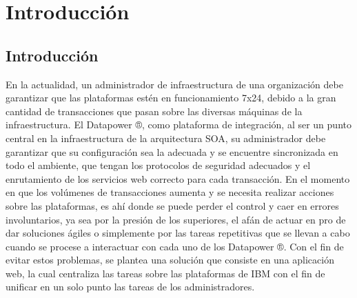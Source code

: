 \chapter{Introducción}
\section*{Introducción}
En la actualidad, un administrador de infraestructura de una organización debe garantizar que las plataformas estén en funcionamiento 7x24, debido a la gran cantidad de transacciones que pasan sobre las diversas máquinas de la infraestructura.
\newline
El Datapower ®, como plataforma de integración, al ser un punto central en la infraestructura de la arquitectura SOA, su administrador debe garantizar que su configuración sea la adecuada y se encuentre sincronizada en todo el ambiente, que tengan los protocolos de seguridad adecuados y el enrutamiento de los servicios web correcto para cada transacción.
\newline
En el momento en que los volúmenes de transacciones aumenta y se necesita realizar acciones sobre las plataformas, es ahí donde se puede perder el control y caer en errores involuntarios, ya sea por la presión de los superiores, el afán de actuar en pro de dar soluciones ágiles o simplemente por las tareas repetitivas que se llevan a cabo cuando se procese a interactuar con cada uno de los Datapower ®.
Con el fin de evitar estos problemas, se plantea una solución que consiste en una aplicación web, la cual centraliza las tareas sobre las plataformas de IBM con el fin de unificar en un solo punto las tareas de los administradores.